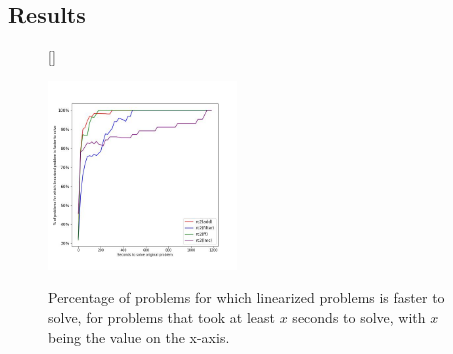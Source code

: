 \documentclass[runningheads]{llncs}
\begin{document}
\subsection{Results}

\begin{figure}
	[\FBwidth]
	{\caption{Percentage of problems for which linearized problems is faster to solve, for problems that took at least $\mathit{x}$ seconds to solve, with $\mathit{x}$  being the value on the x-axis. \\ \label{faster}}}
	{\includegraphics[width=5cm]{figures/faster_to_solve_m.jpg}}

\end{figure}




 
\end{document}
